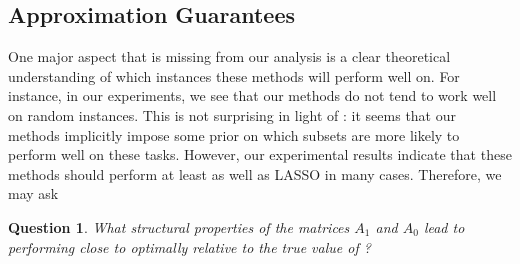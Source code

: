 \documentclass{amsart}
\newtheorem{question}[theorem]{Question}
\theoremstyle{definition}
\begin{document}
\subsection{Approximation Guarantees}
One major aspect that is missing from our analysis is a clear theoretical understanding of which instances these methods will perform well on.
For instance, in our experiments, we see that our methods do not tend to work well on random instances.
This is not surprising in light of : it seems that our methods implicitly impose some prior on which subsets are more likely to perform well on these tasks.
However, our experimental results indicate that these methods should perform at least as well as LASSO in many cases.
Therefore, we may ask
\begin{question}
    What structural properties of the matrices $A_1$ and $A_0$ lead to  performing close to optimally relative to the true value of ?
\end{question}


\end{document}
